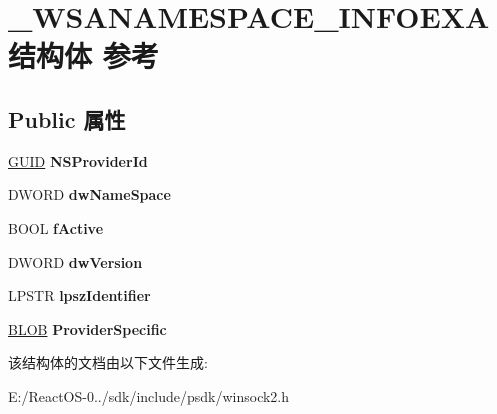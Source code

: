 \hypertarget{struct___w_s_a_n_a_m_e_s_p_a_c_e___i_n_f_o_e_x_a}{}\section{\+\_\+\+W\+S\+A\+N\+A\+M\+E\+S\+P\+A\+C\+E\+\_\+\+I\+N\+F\+O\+E\+X\+A结构体 参考}
\label{struct___w_s_a_n_a_m_e_s_p_a_c_e___i_n_f_o_e_x_a}
\subsection*{Public 属性}
\begin{DoxyCompactItemize}
\item 
\mbox{\label{struct___w_s_a_n_a_m_e_s_p_a_c_e___i_n_f_o_e_x_a_a2ebd515e7ba4759b32140b32b962b146}} 
\hyperlink{interface_g_u_i_d}{G\+U\+ID} {\bfseries N\+S\+Provider\+Id}
\item 
\mbox{\label{struct___w_s_a_n_a_m_e_s_p_a_c_e___i_n_f_o_e_x_a_a0cdcb6d15268b68eb79aa749737e20a2}} 
D\+W\+O\+RD {\bfseries dw\+Name\+Space}
\item 
\mbox{\label{struct___w_s_a_n_a_m_e_s_p_a_c_e___i_n_f_o_e_x_a_af64dec02b21b899e0365c09039d72c30}} 
B\+O\+OL {\bfseries f\+Active}
\item 
\mbox{\label{struct___w_s_a_n_a_m_e_s_p_a_c_e___i_n_f_o_e_x_a_a437a45650d0d04b64a3da3731b2cae14}} 
D\+W\+O\+RD {\bfseries dw\+Version}
\item 
\mbox{\label{struct___w_s_a_n_a_m_e_s_p_a_c_e___i_n_f_o_e_x_a_a96049c17574bbb7a6d607a3674bbd281}} 
L\+P\+S\+TR {\bfseries lpsz\+Identifier}
\item 
\mbox{\label{struct___w_s_a_n_a_m_e_s_p_a_c_e___i_n_f_o_e_x_a_abe1aefbb58c6dc9a23062cce448b3cdf}} 
\hyperlink{struct___b_l_o_b}{B\+L\+OB} {\bfseries Provider\+Specific}
\end{DoxyCompactItemize}


该结构体的文档由以下文件生成\+:\begin{DoxyCompactItemize}
\item 
E\+:/\+React\+O\+S-\/0../sdk/include/psdk/winsock2.\+h\end{DoxyCompactItemize}

